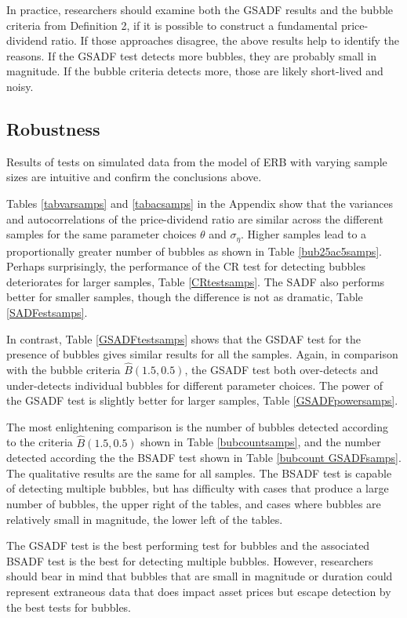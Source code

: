 \documentclass[12pt]{article}
\begin{document}
In practice, researchers should examine both the GSADF results and the bubble criteria from Definition 2, if it is possible to construct a fundamental price-dividend ratio. If those approaches disagree, the above results help to identify the reasons. If the GSADF test detects more bubbles, they are probably small in magnitude. If the bubble criteria detects more, those are likely short-lived and noisy.

\subsection{Robustness}

Results of tests on simulated data from the model of ERB with varying sample sizes are intuitive and confirm the conclusions above. 

Tables \ref{tabvarsamps} and \ref{tabacsamps} in the Appendix show that the variances and autocorrelations of the price-dividend ratio are similar across the different samples for the same parameter choices $\theta$ and $\sigma_{\eta}$. Higher samples lead to a proportionally greater number of bubbles as shown in Table \ref{bub25ac5samps}. Perhaps surprisingly, the performance of the CR test for detecting bubbles deteriorates for larger samples, Table \ref{CRtestsamps}. The SADF also performs better for smaller samples, though the difference is not as dramatic, Table \ref{SADFestsamps}.

In contrast, Table \ref{GSADFtestsamps} shows that the GSDAF test for the presence of bubbles gives similar results for all the samples. Again, in comparison with the bubble criteria $\widehat{B}(1.5,0.5)$, the GSADF test both over-detects and under-detects individual bubbles for different parameter choices. The power of the GSADF test is slightly better for larger samples, Table \ref{GSADFpowersamps}.

The most enlightening comparison is the number of bubbles detected according to the criteria $\widehat{B}(1.5,0.5)$ shown in Table \ref{bubcountsamps}, and the number detected according the the BSADF test shown in Table \ref{bubcount GSADFsamps}. The qualitative results are the same for all samples. The BSADF test is capable of detecting multiple bubbles, but has difficulty with cases that produce a large number of bubbles, the upper right of the tables, and cases where bubbles are relatively small in magnitude, the lower left of the tables.

The GSADF test is the best performing test for bubbles and the associated BSADF test is the best for detecting multiple bubbles. However, researchers should bear in mind that bubbles that are small in magnitude or duration could represent extraneous data that does impact asset prices but escape detection by the best tests for bubbles.
\end{document}
